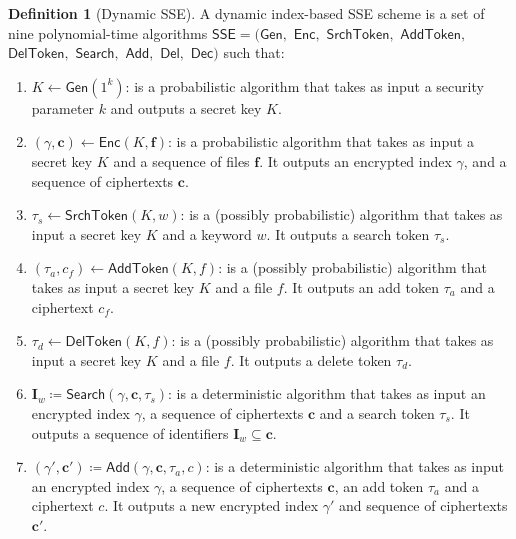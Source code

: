 \documentclass[12pt,a4paper]{article}
\theoremstyle{definition}
\newtheorem{definition}{Definition}
\begin{document}
\begin{definition}[Dynamic SSE]
\cite{Kamara}
A dynamic index-based SSE scheme is a set of nine polynomial-time algorithms
\(\mathsf{SSE = (Gen,}\) \(\mathsf{Enc,}\) \(\mathsf{SrchToken,}\)
\(\mathsf{AddToken,}\) \(\mathsf{DelToken,}\) \(\mathsf{Search,}\)
\(\mathsf{Add,}\) \(\mathsf{Del,}\) \(\mathsf{Dec})\) such that:

\begin{enumerate}
\item \(K \leftarrow \mathsf{Gen}(1^k)\): is a probabilistic algorithm that
	takes as input a security parameter \(k\) and outputs a secret key
	\(K\).

\item \((\gamma, \mathbf{c}) \leftarrow \mathsf{Enc}(K, \mathbf{f})\): is a
	probabilistic algorithm that takes as input a secret key \(K\) and
	a sequence of files \(\mathbf{f}\). It outputs an encrypted index
	\(\gamma\), and a sequence of ciphertexts \(\mathbf{c}\).

\item \(\tau_s \leftarrow \mathsf{SrchToken}(K, w)\): is a (possibly
	probabilistic) algorithm that takes as input a secret key \(K\) and a
	keyword \(w\). It outputs a search token \(\tau_s\).

\item \((\tau_a, c_f) \leftarrow \mathsf{AddToken}(K, f)\): is a (possibly
	probabilistic) algorithm that takes as input a secret key \(K\) and a
	file \(f\). It outputs an add token \(\tau_a\) and a ciphertext
	\(c_f\).

\item \(\tau_d \leftarrow \mathsf{DelToken}(K, f)\): is a (possibly
	probabilistic) algorithm that takes as input a secret key \(K\) and a
	file \(f\). It outputs a delete token \(\tau_d\).

\item \(\mathbf{I}_w \coloneqq \mathsf{Search}(\gamma, \mathbf{c}, \tau_s)\):
	is a deterministic algorithm that takes as input an encrypted index
	\(\gamma\), a sequence of ciphertexts \(\mathbf{c}\) and a search
	token \(\tau_s\). It outputs a sequence of identifiers \(\mathbf{I}_w
	\subseteq \mathbf{c}\).

\item \((\gamma', \mathbf{c}') \coloneqq \mathsf{Add}(\gamma, \mathbf{c},
	\tau_a, c)\): is a deterministic algorithm that takes as input an
	encrypted index \(\gamma\), a sequence of ciphertexts \(\mathbf{c}\),
	an add token \(\tau_a\) and a ciphertext \(c\). It outputs a new
	encrypted index \(\gamma'\) and sequence of ciphertexts
	\(\mathbf{c}'\).


\end{enumerate}
\end{definition}
\end{document}
